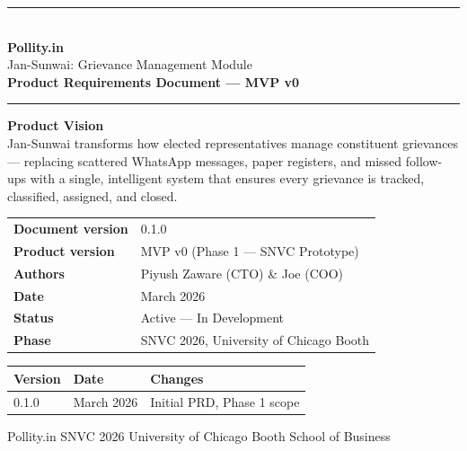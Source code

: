 \documentclass[11pt, a4paper]{article}
\begin{document}
\begin{titlepage}
\centering
\vspace*{1.5cm}
{\color{pollityblue}\rule{\linewidth}{1.5pt}}\\[0.4cm]
{\Huge\bfseries\color{pollityblue} Pollity.in}\\[0.3cm]
{\Large Jan-Sunwai: Grievance Management Module}\\[0.2cm]
{\large\bfseries Product Requirements Document --- MVP v0}\\[0.3cm]
{\color{pollityblue}\rule{\linewidth}{1.5pt}}

\vspace{1.2cm}

\begin{visionbox}
\centering
\textbf{Product Vision}\\[0.4em]
Jan-Sunwai transforms how elected representatives manage constituent grievances ---
replacing scattered WhatsApp messages, paper registers, and missed follow-ups
with a single, intelligent system that ensures every grievance is tracked,
classified, assigned, and closed.
\end{visionbox}

\vspace{1.2cm}

\begin{tabular}{ll}
\toprule
\textbf{Document version} & 0.1.0 \\
\textbf{Product version}  & MVP v0 (Phase 1 --- SNVC Prototype) \\
\textbf{Authors}          & Piyush Zaware (CTO) \& Joe (COO) \\
\textbf{Date}             & March 2026 \\
\textbf{Status}           & Active --- In Development \\
\textbf{Phase}            & SNVC 2026, University of Chicago Booth \\
\bottomrule
\end{tabular}

\vspace{1.2cm}

\begin{tabular}{lll}
\toprule
\textbf{Version} & \textbf{Date} & \textbf{Changes} \\
\midrule
0.1.0 & March 2026 & Initial PRD, Phase 1 scope \\
\bottomrule
\end{tabular}

\vfill
{\small\color{gray} Pollity.in \textbar{} SNVC 2026 \textbar{} University of Chicago Booth School of Business}
\end{titlepage}
\end{document}
